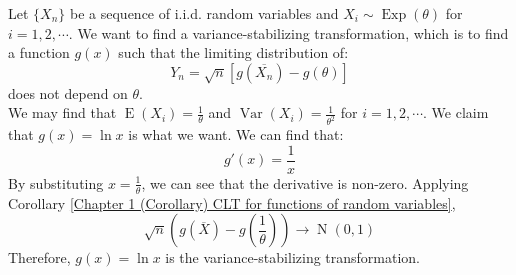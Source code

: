 \documentclass{huhtakm-template-book-v2}
\DeclareMathOperator{\E}{E}
\DeclareMathOperator{\Var}{Var}
\DeclareMathOperator{\Exp}{Exp}
\DeclareMathOperator{\N}{N}
\begin{document}
\begin{eg}
	Let $\{X_{n}\}$ be a sequence of i.i.d. random variables and $X_{i}\sim\Exp(\theta)$ for $i=1,2,\cdots$. We want to find a variance-stabilizing transformation, which is to find a function $g(x)$ such that the limiting distribution of:
	\begin{equation*}
		Y_{n}=\sqrt{n}[g(\overline{X_{n}})-g(\theta)]
	\end{equation*}
	does not depend on $\theta$.\\
	We may find that $\E(X_{i})=\frac{1}{\theta}$ and $\Var(X_{i})=\frac{1}{\theta^{2}}$ for $i=1,2,\cdots$. We claim that $g(x)=\ln{x}$ is what we want. We can find that:
	\begin{equation*}
		g'(x)=\frac{1}{x}
	\end{equation*}
	By substituting $x=\frac{1}{\theta}$, we can see that the derivative is non-zero. Applying Corollary \ref{Chapter 1 (Corollary) CLT for functions of random variables},
	\begin{equation*}
		\sqrt{n}\left(g(\overline{X})-g\left(\frac{1}{\theta}\right)\right)\to\N(0,1)
	\end{equation*}
	Therefore, $g(x)=\ln{x}$ is the variance-stabilizing transformation.
\end{eg}
\end{document}
